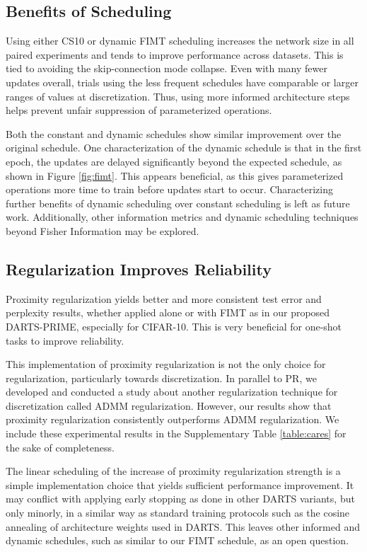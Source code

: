 \documentclass[letterpaper]{article} \usepackage{aaai22}  \usepackage{times}  \usepackage{helvet}  \usepackage{courier}  \usepackage[hyphens]{url}  \usepackage{graphicx} \urlstyle{rm} \def\UrlFont{\rm}  \usepackage{natbib}  \usepackage{caption} \DeclareCaptionStyle{ruled}{labelfont=normalfont,labelsep=colon,strut=off} \frenchspacing  \setlength{\pdfpagewidth}{8.5in}  \setlength{\pdfpageheight}{11in}  \usepackage{algorithm}
\begin{document}
\subsection{Benefits of Scheduling}
Using either CS10 or dynamic FIMT scheduling increases the network size in all paired experiments and tends to improve performance across datasets. This is tied to avoiding the skip-connection mode collapse. Even with many fewer  updates overall, trials using the less frequent schedules have comparable or larger ranges of  values at discretization. Thus, using more informed architecture steps helps prevent unfair suppression of parameterized operations.

Both the constant and dynamic schedules show similar improvement over the original schedule. One characterization of the dynamic schedule is that in the first epoch, the  updates are delayed significantly beyond the expected schedule, as shown in Figure \ref{fig:fimt}. This appears beneficial, as this gives parameterized operations more time to train before  updates start to occur. Characterizing further benefits of dynamic scheduling over constant scheduling is left as future work. Additionally, other information metrics and dynamic scheduling techniques beyond Fisher Information may be explored. 

\subsection{Regularization Improves Reliability}
Proximity regularization yields better and more consistent test error and perplexity results, whether applied alone or with FIMT as in our proposed DARTS-PRIME, especially for CIFAR-10. This is very beneficial for one-shot tasks to improve reliability. 

This implementation of proximity regularization is not the only choice for regularization, particularly towards discretization. In parallel to PR, we developed and conducted a study about another regularization technique for discretization called ADMM regularization. However, our results show that proximity regularization consistently outperforms ADMM regularization. We include these experimental results in the Supplementary Table \ref{table:cares} for the sake of completeness.

The linear scheduling of the increase of proximity regularization strength is a simple implementation choice that yields sufficient performance improvement. It may conflict with applying early stopping as done in other DARTS variants, but only minorly, in a similar way as standard training protocols such as the cosine annealing of architecture weights used in DARTS. This leaves other informed and dynamic schedules, such as similar to our FIMT schedule, as an open question.
\end{document}
